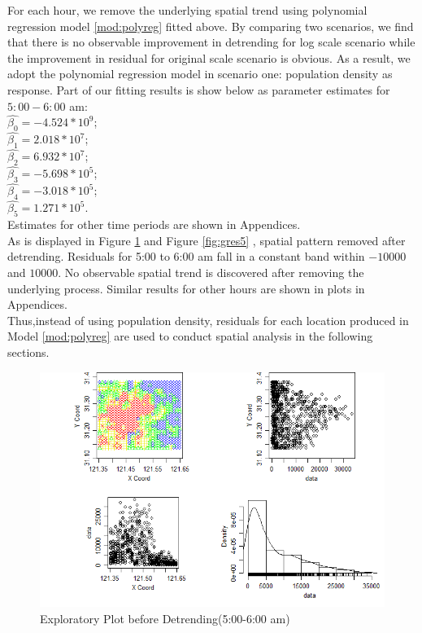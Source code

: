 \documentclass[hidelinks,12pt]{article}
\begin{document}
	For each hour, we remove the underlying spatial trend using polynomial regression model \ref{mod:polyreg} fitted above. By comparing two scenarios, we find that there is no observable improvement in detrending for log scale scenario while the improvement in residual for original scale scenario is obvious. As a result, we adopt the polynomial regression model in scenario one: population density as response. Part of our fitting results is show below as parameter estimates for $5:00-6:00$ am:\\
	\indent $\hat{\beta_0}=-4.524*10^9$;\\
	\indent$\hat{\beta_1}=2.018*10^7$;\\
	\indent$\hat{\beta_2}=6.932*10^7$;\\
	\indent$\hat{\beta_3}=-5.698*10^5$;\\
	\indent$\hat{\beta_4}=-3.018*10^5$;\\
	\indent$\hat{\beta_5}=1.271*10^5$.\\
	Estimates for other time periods are shown in Appendices.\\
	
	As is displayed in Figure \ref{fig:geo5} and Figure \ref{fig:gres5} , spatial pattern removed after detrending. Residuals for 5:00 to 6:00 am fall in a constant band within $-10000$ and  $10000$. No observable spatial trend is discovered after removing the underlying process. Similar results for other hours are shown in plots in Appendices.\\
	
	Thus,instead of using population density, residuals for each location produced in Model \ref{mod:polyreg} are used to conduct spatial analysis in the following sections.
	
	
	\begin{figure}[!ht]
		\includegraphics[width=\textwidth]{geo5.png}
		\caption{Exploratory Plot before Detrending(5:00-6:00 am) \label{fig:geo5}}
	\end{figure}
	\FloatBarrier
	
\end{document}
